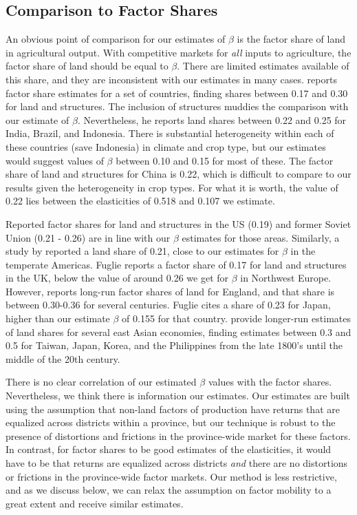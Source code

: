 \documentclass[11pt]{article}
\begin{document}
\subsection{Comparison to Factor Shares}
An obvious point of comparison for our estimates of $\beta$ is the factor share of land in agricultural output. With competitive markets for \textit{all} inputs to agriculture, the factor share of land should be equal to $\beta$. There are limited estimates available of this share, and they are inconsistent with our estimates in many cases. \citet{fuglie2010} reports factor share estimates for a set of countries, finding shares between 0.17 and 0.30 for land and structures. The inclusion of structures muddies the comparison with our estimate of $\beta$. Nevertheless, he reports land shares between 0.22 and 0.25 for India, Brazil, and Indonesia. There is substantial heterogeneity within each of these countries (save Indonesia) in climate and crop type, but our estimates would suggest values of $\beta$ between 0.10 and 0.15 for most of these. The factor share of land and structures for China is 0.22, which is difficult to compare to our results given the heterogeneity in crop types. For what it is worth, the value of 0.22 lies between the elasticities of 0.518 and 0.107 we estimate.

Reported factor shares for land and structures in the US (0.19) and former Soviet Union (0.21 - 0.26) are in line with our $\beta$ estimates for those areas. Similarly, a study by \citet{jg1992} reported a land share of 0.21, close to our estimates for $\beta$ in the temperate Americas. Fuglie reports a factor share of 0.17 for land and structures in the UK, below the value of around 0.26 we get for $\beta$ in Northwest Europe. However, \citet{Clark2002} reports long-run factor shares of land for England, and that share is between 0.30-0.36 for several centuries. Fuglie cites a share of 0.23 for Japan, higher than our estimate $\beta$ of 0.155 for that country. \citet{hrs1979} provide longer-run estimates of land shares for several east Asian economies, finding estimates between 0.3 and 0.5 for Taiwan, Japan, Korea, and the Philippines from the late 1800's until the middle of the 20th century.

There is no clear correlation of our estimated $\beta$ values with the factor shares. Nevertheless, we think there is information our estimates. Our estimates are built using the assumption that non-land factors of production have returns that are equalized across districts within a province, but our technique is robust to the presence of distortions and frictions in the province-wide market for these factors. In contrast, for factor shares to be good estimates of the elasticities, it would have to be that returns are equalized across districts \textit{and} there are no distortions or frictions in the province-wide factor markets. Our method is less restrictive, and as we discuss below, we can relax the assumption on factor mobility to a great extent and receive similar estimates. 
\end{document}

